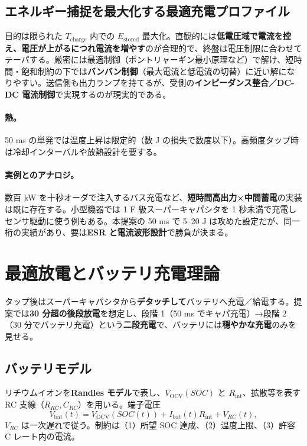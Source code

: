 \documentclass[11pt]{ctexart}
\begin{document}
\subsection{エネルギー捕捉を最大化する最適充電プロファイル}
目的は限られた $T_{\mathrm{charge}}$ 内での $E_{\mathrm{stored}}$ 最大化。直観的には\textbf{低電圧域で電流を控え、電圧が上がるにつれ電流を増やす}のが合理的で、終盤は電圧制限に合わせてテーパする。厳密には最適制御（ポントリャーギン最小原理など）で解け、短時間・飽和制約の下では\textbf{バンバン制御}（最大電流と低電流の切替）に近い解になりやすい。送信側も出力ランプを持てるが、受側の\textbf{インピーダンス整合／DC-DC 電流制御}で実現するのが現実的である。

\paragraph{熱。} 50 ms の単発では温度上昇は限定的（数 J の損失で数度以下）。高頻度タップ時は冷却インターバルや放熱設計を要する。

\paragraph{実例とのアナロジ。} 数百 kW を十秒オーダで注入するバス充電など、\textbf{短時間高出力×中間蓄電}の実装は既に存在する。小型機器では 1 F 級スーパーキャパシタを 1 秒未満で充電しセンサ駆動に使う例もある。本提案の 50 ms で 5--20 J は攻めた設定だが、同一桁の実績があり、要は\textbf{ESR と電流波形設計}で勝負が決まる。

\section{最適放電とバッテリ充電理論}
タップ後はスーパーキャパシタから\textbf{デタッチして}バッテリへ充電／給電する。提案では\textbf{30 分超の後段放電}を想定し、段階 1（50 ms でキャパ充電）→段階 2（30 分でバッテリ充電）という\textbf{二段充電}で、バッテリには\textbf{穏やかな充電}のみを見せる。

\subsection{バッテリモデル}
リチウムイオンを\textbf{Randles モデル}で表し、$V_{\mathrm{OCV}}(SOC)$ と $R_{\mathrm{int}}$、拡散等を表す RC 支線（$R_{RC},C_{RC}$）を用いる。端子電圧
\begin{equation}
V_{\mathrm{bat}}(t)=V_{\mathrm{OCV}}(SOC(t))+I_{\mathrm{bat}}(t)R_{\mathrm{int}}+V_{RC}(t),
\end{equation}
$V_{RC}$ は一次遅れで従う。制約は（1）所望 SOC 達成、（2）温度上限、（3）許容 C レート内の電流。
\end{document}
